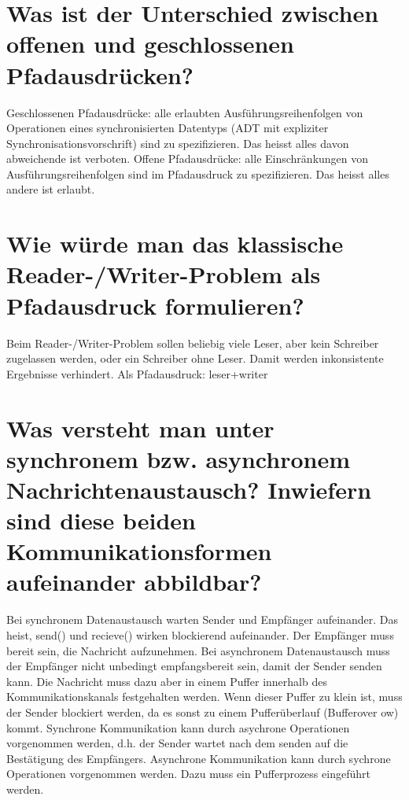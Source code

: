 \documentclass[12pt,a4paper,ngerman]{scrartcl}
\newcommand{\question}[1]{#1}
\newenvironment {answer}
                {}
                {}
\begin{document}
\section{\question{Was ist der Unterschied zwischen offenen und geschlossenen Pfadausdrücken?}}
\begin{answer}
Geschlossenen Pfadausdrücke: alle erlaubten Ausführungsreihenfolgen von Operationen eines synchronisierten
Datentyps (ADT mit expliziter Synchronisationsvorschrift) sind zu spezifizieren. Das
heisst alles davon abweichende ist verboten.
Offene Pfadausdrücke: alle Einschränkungen von Ausführungsreihenfolgen sind im Pfadausdruck
zu spezifizieren. Das heisst alles andere ist erlaubt.
\end{answer}

\section{\question{Wie würde man das klassische Reader-/Writer-Problem als Pfadausdruck formulieren?}}
\begin{answer}
Beim Reader-/Writer-Problem sollen beliebig viele Leser, aber kein Schreiber zugelassen werden,
oder ein Schreiber ohne Leser. Damit werden inkonsistente Ergebnisse verhindert.
Als Pfadausdruck: leser+writer
\end{answer}

\section{\question{Was versteht man unter synchronem bzw. asynchronem Nachrichtenaustausch? Inwiefern sind diese beiden Kommunikationsformen aufeinander abbildbar?}}
\begin{answer}
Bei synchronem Datenaustausch warten Sender und Empfänger aufeinander. Das heist, send()
und recieve() wirken blockierend aufeinander. Der Empfänger muss bereit sein, die Nachricht aufzunehmen.
Bei asynchronem Datenaustausch muss der Empfänger nicht unbedingt empfangsbereit sein, damit
der Sender senden kann. Die Nachricht muss dazu aber in einem Puffer innerhalb des Kommunikationskanals
festgehalten werden. Wenn dieser Puffer zu klein ist, muss der Sender blockiert
werden, da es sonst zu einem Pufferüberlauf (Bufferover
ow) kommt.
Synchrone Kommunikation kann durch asychrone Operationen vorgenommen werden, d.h. der
Sender wartet nach dem senden auf die Bestätigung des Empfängers.
Asynchrone Kommunikation kann durch sychrone Operationen vorgenommen werden. Dazu muss
ein Pufferprozess eingeführt werden.
\end{answer}
\end{document}
